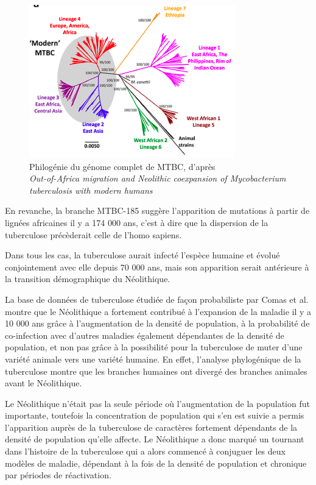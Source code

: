 \documentclass[twoside,a4paper,11pt,frenchb,openany]{report}
\begin{document}
\begin{figure}[h!]
\includegraphics[scale=0.7]{worldlignee.png}
\caption{Philogénie du génome complet de MTBC, d'après\\ \textit{Out-of-Africa migration and Neolithic coexpansion of Mycobacterium\\tuberculosis with modern humans}}
\end{figure}

En revanche, la branche MTBC-185 suggère l'apparition de mutations à partir de lignées africaines il y a 174 000 ans, c'est à dire que la dispersion de la tuberculose précèderait celle de l'homo sapiens.


Dans tous les cas, la tuberculose aurait infecté l'espèce humaine et évolué conjointement avec elle depuis 70 000 ans, mais son apparition serait antérieure à la transition démographique du Néolithique.

La base de données de tuberculose étudiée de façon probabiliste par Comas et al.\cite{comas} montre que le Néolithique a fortement contribué à l'expansion de la maladie il y a 10 000 ans grâce à l'augmentation de la densité de population, à la probabilité de co-infection avec d'autres maladies également dépendantes de la densité de population, et non pas grâce à la possibilité pour la tuberculose de muter d'une variété animale vers une variété humaine. En effet, l'analyse phylogénique de la tuberculose montre que les branches humaines ont divergé des branches animales avant le Néolithique.

Le Néolithique n'était pas la seule période où l'augmentation de la population fut importante, toutefois la concentration de population qui s'en est suivie a permis l'apparition auprès de la tuberculose de caractères fortement dépendants de la densité de population qu'elle affecte. Le Néolithique a donc marqué un tournant dans l'histoire de la tuberculose qui a alors commencé à conjuguer les deux modèles de maladie, dépendant à la fois de la densité de population et chronique par périodes de réactivation.
\end{document}

